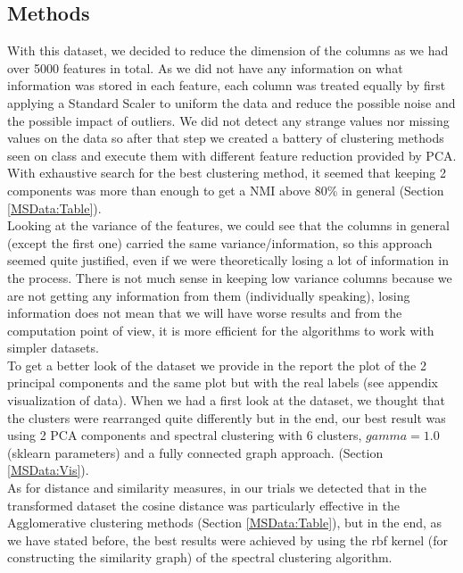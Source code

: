 \documentclass[12pt]{article}
\begin{document}
\subsection{Methods}
With this dataset, we decided to reduce the dimension of the columns as we had over 5000 features in total. As we did not have any information on what information was stored in each feature, each column was treated equally by first applying a Standard Scaler to uniform the data and reduce the possible noise and the possible impact of outliers. We did not detect any strange values nor missing values on the data so after that step we created a battery of clustering methods seen on class and execute them with different feature reduction provided by PCA. With exhaustive search for the best clustering method, it seemed that keeping 2 components was more than enough to get a NMI above 80\% in general (Section \ref{MSData:Table}). \\

Looking at the variance of the features, we could see that the columns in general (except the first one) carried the same variance/information, so this approach seemed quite justified, even if we were theoretically losing a lot of information in the process. There is not much sense in keeping low variance columns because we are not getting any information from them (individually speaking), losing information does not mean that we will have worse results and from the computation point of view, it is more efficient for the algorithms to work with simpler datasets.\\

To get a better look of the dataset we provide in the report the plot of the 2 principal components and the same plot but with the real labels (see appendix visualization of data). When we had a first look at the dataset, we thought that the clusters were rearranged quite differently but in the end, our best result was using 2 PCA components and spectral clustering with 6 clusters, $gamma=1.0$ (sklearn parameters) and a fully connected graph approach. (Section \ref{MSData:Vis}).\\

As for distance and similarity measures, in our trials we detected that in the transformed dataset the cosine distance was particularly effective in the Agglomerative clustering methods (Section \ref{MSData:Table}), but in the end, as we have stated before, the best results were achieved by using the rbf kernel (for constructing the similarity graph) of the spectral clustering algorithm.\\
\end{document}
